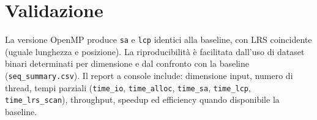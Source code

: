 	\section{Validazione}
		La versione OpenMP produce \texttt{sa} e \texttt{lcp} identici alla baseline, con LRS coincidente (uguale lunghezza e posizione).
		La riproducibilità è facilitata dall'uso di dataset binari determinati per dimensione e dal confronto con la baseline (\texttt{seq\_summary.csv}).
		Il report a console include: dimensione input, numero di thread, tempi parziali (\texttt{time\_io}, \texttt{time\_alloc}, \texttt{time\_sa}, \texttt{time\_lcp}, \texttt{time\_lrs\_scan}), throughput, speedup ed efficiency quando disponibile la baseline.